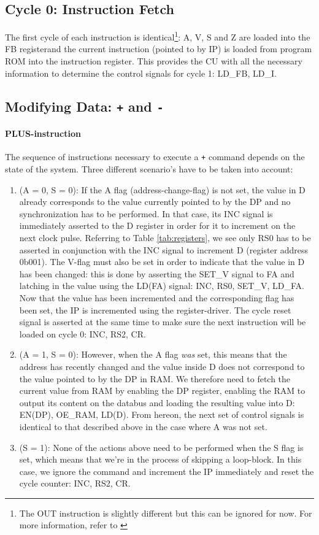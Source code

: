 \subsection{Cycle 0: Instruction Fetch}
The first cycle of each instruction is identical\footnote{The OUT instruction is slightly different but this can be ignored for now. For more information, refer to \label{sec:??}}: A, V, S and Z are loaded into the FB registerand the current instruction (pointed to by IP) is loaded from program ROM into the instruction register. This provides the CU with all the necessary information to determine the control signals for cycle 1: LD\_FB, LD\_I.

\subsection{Modifying Data: \texttt{+} and \texttt{-}} \label{sec:sequences:+-}
\paragraph{PLUS-instruction} The sequence of instructions necessary to execute a \texttt{+} command depends on the state of the system. Three different scenario's have to be taken into account:
\begin{enumerate}
\item (A = 0, S = 0): If the A flag (address-change-flag) is not set, the value in D already corresponds to the value currently pointed to by the DP and no synchronization has to be performed. In that case, its INC signal is immediately asserted to the D register in order for it to increment on the next clock pulse. Referring to Table \ref{tab:registers}, we see only RS0 has to be asserted in conjunction with the INC signal to increment D (register address 0b001). The V-flag must also be set in order to indicate that the value in D has been changed: this is done by asserting the SET\_V signal to FA and latching in the value using the LD(FA) signal: INC, RS0, SET\_V, LD\_FA. Now that the value has been incremented and the corresponding flag has been set, the IP is incremented using the register-driver. The cycle reset signal is asserted at the same time to make sure the next instruction will be loaded on cycle 0: INC, RS2, CR.
\item (A = 1, S = 0): However, when the A flag \emph{was} set, this means that the address has recently changed and the value inside D does not correspond to the value pointed to by the DP in RAM. We therefore need to fetch the current value from RAM by enabling the DP register, enabling the RAM to output its content on the databus and loading the resulting value into D: EN(DP), OE\_RAM, LD(D). From hereon, the next set of control signals is identical to that described above in the case where A was not set.
  \item (S = 1): None of the actions above need to be performed when the S flag is set, which means that we're in the process of skipping a loop-block. In this case, we ignore the command and increment the IP immediately and reset the cycle counter: INC, RS2, CR.
\end{enumerate}


